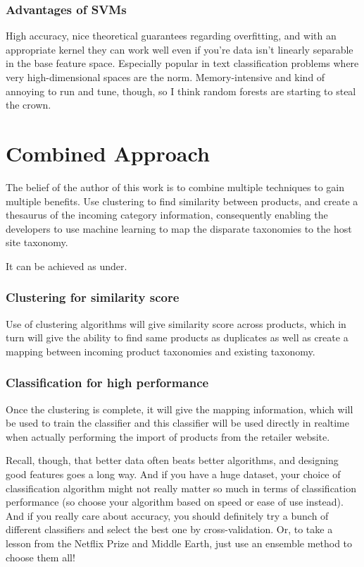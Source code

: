 \documentclass[12pt]{book}
\begin{document}
\subsubsection{Advantages of SVMs} High accuracy, nice theoretical guarantees regarding overfitting, and with an appropriate kernel they can work well even if you're data isn't linearly separable in the base feature space. Especially popular in text classification problems where very high-dimensional spaces are the norm. Memory-intensive and kind of annoying to run and tune, though, so I think random forests are starting to steal the crown.

\section{Combined Approach}
The belief of the author of this work is to combine multiple techniques to gain multiple benefits. Use clustering to find similarity between products, and create a thesaurus of the incoming category information, consequently enabling the developers to use machine learning to map the disparate taxonomies to the host site taxonomy.

It can be achieved as under.
\subsubsection{Clustering for similarity score}
Use of clustering algorithms will give similarity score across products, which in turn will give the ability to find same products as duplicates as well as create a mapping between incoming product taxonomies and existing taxonomy.

\subsubsection{Classification for high performance}
Once the clustering is complete, it will give the mapping information, which will be used to train the classifier and this classifier will be used directly in realtime when actually performing the import of products from the retailer website.

Recall, though, that better data often beats better algorithms, and designing good features goes a long way. And if you have a huge dataset, your choice of classification algorithm might not really matter so much in terms of classification performance (so choose your algorithm based on speed or ease of use instead).
And if you really care about accuracy, you should definitely try a bunch of different classifiers and select the best one by cross-validation. Or, to take a lesson from the Netflix Prize and Middle Earth, just use an ensemble method to choose them all!
\end{document}

